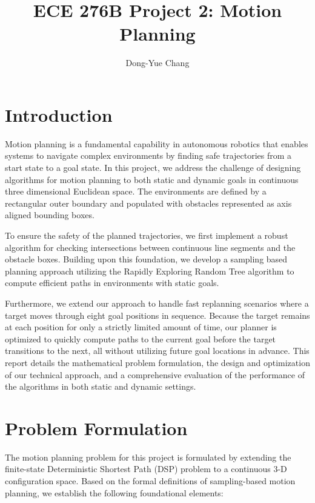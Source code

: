 \documentclass[letterpaper,journal]{IEEEtran}
\begin{document}
\title{ECE 276B Project 2: Motion Planning}
\author{Dong-Yue Chang} %

\maketitle

\section{Introduction}
Motion planning is a fundamental capability in autonomous robotics that enables systems to navigate complex environments by finding safe trajectories from a start state to a goal state. In this project, we address the challenge of designing algorithms for motion planning to both static and dynamic goals in continuous three dimensional Euclidean space. The environments are defined by a rectangular outer boundary and populated with obstacles represented as axis aligned bounding boxes.

To ensure the safety of the planned trajectories, we first implement a robust algorithm for checking intersections between continuous line segments and the obstacle boxes. Building upon this foundation, we develop a sampling based planning approach utilizing the Rapidly Exploring Random Tree algorithm to compute efficient paths in environments with static goals.

Furthermore, we extend our approach to handle fast replanning scenarios where a target moves through eight goal positions in sequence. Because the target remains at each position for only a strictly limited amount of time, our planner is optimized to quickly compute paths to the current goal before the target transitions to the next, all without utilizing future goal locations in advance. This report details the mathematical problem formulation, the design and optimization of our technical approach, and a comprehensive evaluation of the performance of the algorithms in both static and dynamic settings.

\section{Problem Formulation}
The motion planning problem for this project is formulated by extending the finite-state Deterministic Shortest Path (DSP) problem to a continuous 3-D configuration space. Based on the formal definitions of sampling-based motion planning, we establish the following foundational elements:
\end{document}
